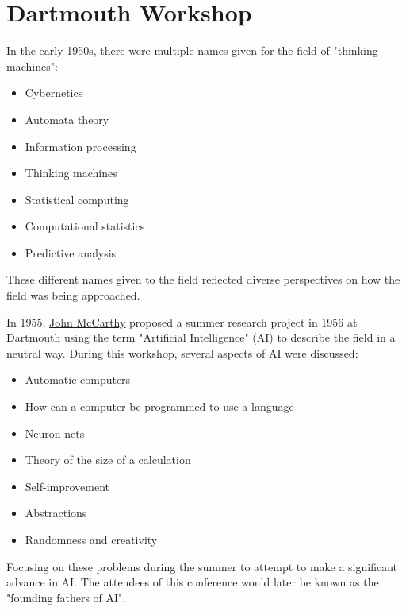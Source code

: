 \section{Dartmouth Workshop}

\par
In the early 1950s, there were multiple names given for the field of "thinking
machines":

\begin{itemize}
	\item Cybernetics
	\item Automata theory
	\item Information processing
	\item Thinking machines
	\item Statistical computing
	\item Computational statistics
	\item Predictive analysis
\end{itemize}

These different names given to the field reflected diverse perspectives on how
the field was being approached.

\par
In 1955,
\href{https://en.wikipedia.org/wiki/John_McCarthy_(computer_scientist)}{John
	McCarthy} proposed a summer research project in 1956 at Dartmouth
using the term "Artificial Intelligence" (AI) to describe the field in a
neutral way. During this workshop, several aspects of AI were discussed:

\begin{itemize}
	\item Automatic computers
	\item How can a computer be programmed to use a language
	\item Neuron nets
	\item Theory of the size of a calculation
	\item Self-improvement
	\item Abstractions
	\item Randomness and creativity
\end{itemize}

\par
Focusing on these problems during the summer to attempt to make a significant
advance in AI\cite{McCarthy_Minsky_Rochester_Shannon_2006}. The attendees of
this conference would later be known as the "founding fathers of AI".
